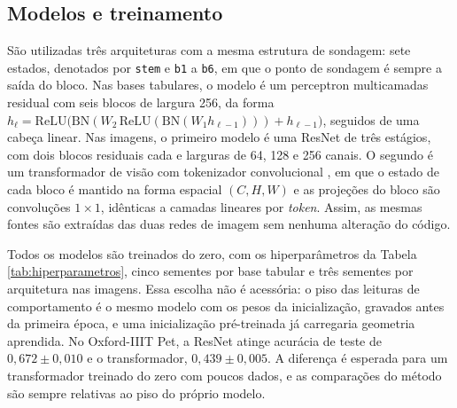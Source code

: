 \subsection{Modelos e treinamento}\label{subsec:modelo}

São utilizadas três arquiteturas com a mesma estrutura de sondagem: sete estados, denotados por \texttt{stem} e \texttt{b1} a \texttt{b6}, em que o ponto de sondagem é sempre a saída do bloco. Nas bases tabulares, o modelo é um perceptron multicamadas residual com seis blocos de largura 256, da forma $h_{\ell} = \mathrm{ReLU}\bigl(\mathrm{BN}(W_2\,\mathrm{ReLU}(\mathrm{BN}(W_1 h_{\ell-1}))) + h_{\ell-1}\bigr)$, seguidos de uma cabeça linear. Nas imagens, o primeiro modelo é uma ResNet \citep{He2016} de três estágios, com dois blocos residuais cada e larguras de 64, 128 e 256 canais. O segundo é um transformador de visão com tokenizador convolucional \citep{Hassani2021}, em que o estado de cada bloco é mantido na forma espacial $(C, H, W)$ e as projeções do bloco são convoluções $1\times1$, idênticas a camadas lineares por \textit{token}. Assim, as mesmas fontes são extraídas das duas redes de imagem sem nenhuma alteração do código.

Todos os modelos são treinados do zero, com os hiperparâmetros da Tabela \ref{tab:hiperparametros}, cinco sementes por base tabular e três sementes por arquitetura nas imagens. Essa escolha não é acessória: o piso das leituras de comportamento é o mesmo modelo com os pesos da inicialização, gravados antes da primeira época, e uma inicialização pré-treinada já carregaria geometria aprendida. No Oxford-IIIT Pet, a ResNet atinge acurácia de teste de $0{,}672 \pm 0{,}010$ e o transformador, $0{,}439 \pm 0{,}005$. A diferença é esperada para um transformador treinado do zero com poucos dados, e as comparações do método são sempre relativas ao piso do próprio modelo.

